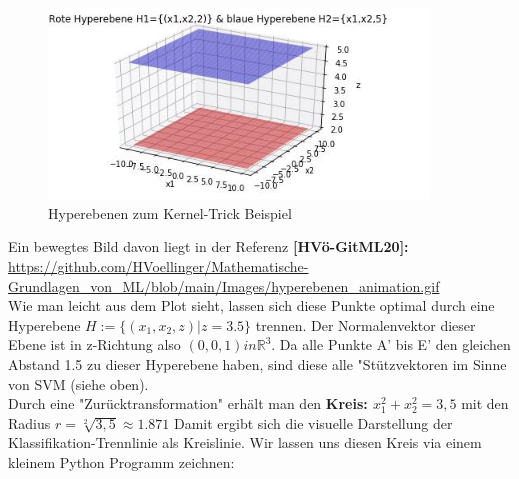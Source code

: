 \documentclass[12pt]{article}
\begin{document}
\begin{figure}[ht]
  \centering
  \hspace*{-0.5cm} 
  \includegraphics[width=0.9\textwidth]{Kernel-Hyperebene-Bild}
  \caption{Hyperebenen zum Kernel-Trick Beispiel}
  \label{fig:SVM_Ebenen}
\end{figure}
%
Ein bewegtes Bild davon liegt in der Referenz \textbf{[HVö-GitML20]:} \url{https://github.com/HVoellinger/Mathematische-Grundlagen_von_ML/blob/main/Images/hyperebenen_animation.gif}\\[0.2cm]
%
Wie man leicht aus dem Plot sieht, lassen sich diese Punkte optimal durch eine Hyperebene ${H := \lbrace (x_1,x_2,z)| z=3.5\rbrace}$ trennen. Der Normalenvektor dieser Ebene ist in z-Richtung also $(0,0,1) in \mathbb{R}^3 $. Da alle Punkte A' bis E' den gleichen Abstand 1.5 zu dieser Hyperebene haben, sind diese alle "Stützvektoren im Sinne von SVM (siehe oben). \\ 
Durch eine "Zurücktransformation" erhält man den \textbf{Kreis: $x_1^2+x_2^2=3,5$ } mit den Radius $r = \sqrt[2]{3,5} \approx 1.871 $  Damit ergibt sich die visuelle Darstellung der Klassifikation-Trennlinie als Kreislinie. Wir lassen uns diesen Kreis via einem kleinem Python Programm zeichnen:\\[0.2cm]
\end{document}
